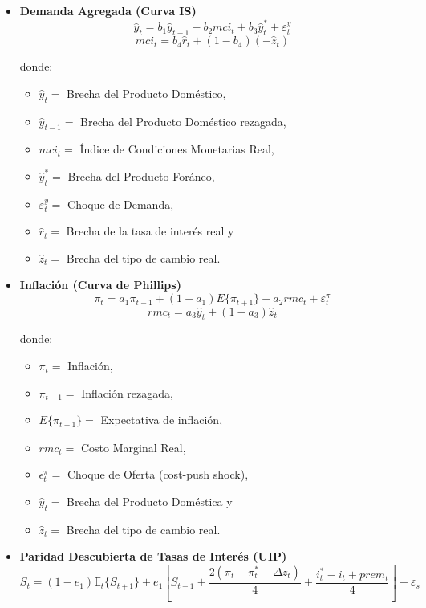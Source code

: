 \documentclass[
]{book}
\begin{document}
\begin{itemize}
\item
  \textbf{Demanda Agregada (Curva IS)}
  \begin{equation}
  \hat{y}_t = b_1 \hat{y}_{t-1} - b_2 mci_t + b_3 \hat{y}_t^* + \varepsilon_t^y
  \end{equation}
  \begin{equation}
  mci_t = b_4 \hat{r}_t + (1-b_4)(-\hat{z}_t)
  \end{equation}

  donde:

  \begin{itemize}
  \item
    \(\hat{y}_t =\) Brecha del Producto Doméstico,
  \item
    \(\hat{y}_{t-1} =\) Brecha del Producto Doméstico rezagada,
  \item
    \(mci_t =\) Índice de Condiciones Monetarias Real,
  \item
    \(\hat{y}_t^* =\) Brecha del Producto Foráneo,
  \item
    \(\varepsilon_t^y =\) Choque de Demanda,
  \item
    \(\hat{r}_t =\) Brecha de la tasa de interés real y
  \item
    \(\hat{z}_t =\) Brecha del tipo de cambio real.
  \end{itemize}
\item
  \textbf{Inflación (Curva de Phillips)}
  \begin{equation}
  \pi_t = a_1 \pi_{t-1} + (1-a_1) E\{\pi_{t+1}\} + a_2 rmc_t + \varepsilon_t^\pi
  \end{equation}
  \begin{equation}
  rmc_t = a_3 \hat{y}_t + (1-a_3) \hat{z}_t
  \end{equation}

  donde:

  \begin{itemize}
  \item
    \(\pi_t =\) Inflación,
  \item
    \(\pi_{t-1} =\) Inflación rezagada,
  \item
    \(E\{\pi_{t+1}\} =\) Expectativa de inflación,
  \item
    \(rmc_t =\) Costo Marginal Real,
  \item
    \(\epsilon_t^\pi =\) Choque de Oferta (cost-push shock),
  \item
    \(\hat{y}_t =\) Brecha del Producto Doméstica y
  \item
    \(\hat{z}_t =\) Brecha del tipo de cambio real.
  \end{itemize}
\item
  \textbf{Paridad Descubierta de Tasas de Interés (UIP)}
  \begin{equation}
  S_t = (1 - e_1) \mathbb{E}_t \{ S_{t+1} \} + e_1 \left[ S_{t-1} + \frac{2(\pi_t - \pi_t^{*} + \Delta \bar{z}_t)}{4} + \frac{i_t^{*} - i_t + prem_t}{4} \right] + \varepsilon_s
  \end{equation}


\end{itemize}
\end{document}
